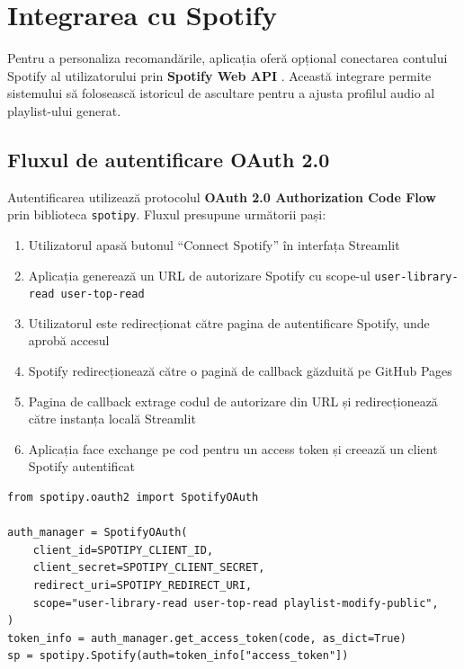 \documentclass[12pt,a4paper]{article}
\begin{document}
\section{Integrarea cu Spotify}
\label{sec:spotify}

Pentru a personaliza recomandările, aplicația oferă opțional conectarea contului Spotify al utilizatorului prin \textbf{Spotify Web API} \cite{spotifyapi}. Această integrare permite sistemului să folosească istoricul de ascultare pentru a ajusta profilul audio al playlist-ului generat.

\subsection{Fluxul de autentificare OAuth 2.0}

Autentificarea utilizează protocolul \textbf{OAuth 2.0 Authorization Code Flow} prin biblioteca \texttt{spotipy}. Fluxul presupune următorii pași:

\begin{enumerate}
    \item Utilizatorul apasă butonul ``Connect Spotify'' în interfața Streamlit
    \item Aplicația generează un URL de autorizare Spotify cu scope-ul \texttt{user-library-read user-top-read}
    \item Utilizatorul este redirecționat către pagina de autentificare Spotify, unde aprobă accesul
    \item Spotify redirecționează către o pagină de callback găzduită pe GitHub Pages 
    \item Pagina de callback extrage codul de autorizare din URL și redirecționează către instanța locală Streamlit
    \item Aplicația face exchange pe cod pentru un access token și creează un client Spotify autentificat
\end{enumerate}

\begin{lstlisting}[caption={Crearea clientului Spotify autentificat}]
from spotipy.oauth2 import SpotifyOAuth

auth_manager = SpotifyOAuth(
    client_id=SPOTIPY_CLIENT_ID,
    client_secret=SPOTIPY_CLIENT_SECRET,
    redirect_uri=SPOTIPY_REDIRECT_URI,
    scope="user-library-read user-top-read playlist-modify-public",
)
token_info = auth_manager.get_access_token(code, as_dict=True)
sp = spotipy.Spotify(auth=token_info["access_token"])
\end{lstlisting}
\end{document}
